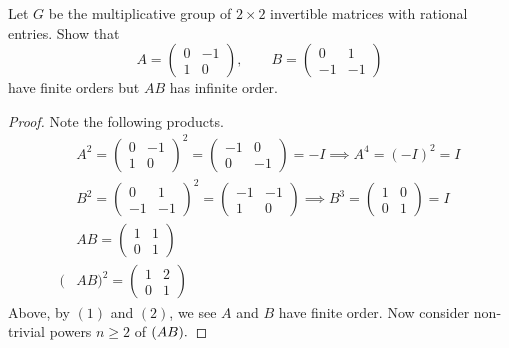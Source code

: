 \documentclass[addpoints,10pt]{exam}
\theoremstyle{plain}
\theoremstyle{definition}
\newtheorem{prob}[thm]{Problem}
\theoremstyle{plain}
\theoremstyle{plain}
\theoremstyle{definition}
\let\oldprob\prob
\let\endoldprob\endprob
\renewenvironment{prob}
  {\begin{singlespace}\oldprob}
  {\endoldprob\end{singlespace}}
\begin{document}
\begin{prob}
  Let $G$ be the multiplicative group of $2\times 2$ invertible matrices with rational entries. Show that
  \[
  A=\begin{pmatrix}0 & -1 \\ 1 & 0\end{pmatrix},
  \qquad
  B=\begin{pmatrix}0 & 1 \\ -1 & -1\end{pmatrix}
  \]
  have finite orders but $AB$ has infinite order.
\end{prob}
\begingroup{}
\begin{proof} Note the following products.
\begin{align}
      &A^{2}=\begin{pmatrix}
      0 & -1\\
      1 & 0
    \end{pmatrix}^{2}=\begin{pmatrix}
      -1 & 0\\
      0 & -1
    \end{pmatrix}=-I\implies A^{4}=(-I)^{2}=I\\
      &B^{2}=\begin{pmatrix}0 & 1 \\
      -1 & -1\end{pmatrix}^{2}=\begin{pmatrix}
      -1 & -1 \\
      1 & 0\end{pmatrix}\implies B^{3}=\begin{pmatrix}
      1 & 0 \\
      0 & 1\end{pmatrix}=I\\
      &AB=\begin{pmatrix}
      1 & 1 \\
      0 & 1 \end{pmatrix}\\
      (&AB)^{2}=\begin{pmatrix}
      1 & 2 \\
      0 & 1\end{pmatrix} 
\end{align}
Above, by $(1)$ and $(2)$, we see $A$ and $B$ have finite order. Now consider non-trivial powers $n\geq 2$ of $(AB).\newline$


\end{proof}
\end{document}

